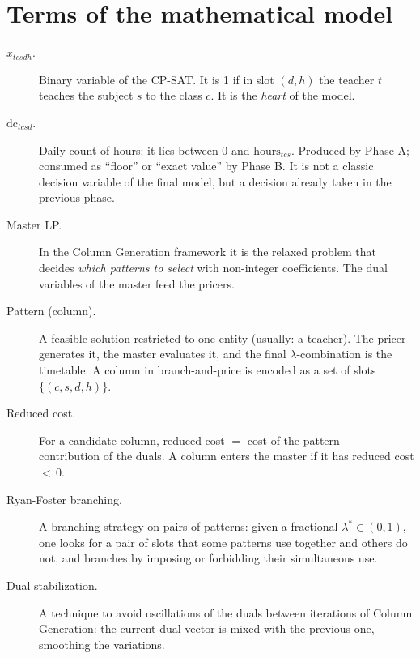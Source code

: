 \section{Terms of the mathematical model}

\begin{description}
\item[$x_{tcsdh}$.]
  Binary variable of the CP-SAT. It is 1 if in slot $(d,h)$ the
  teacher $t$ teaches the subject $s$ to the class $c$. It is the
  \emph{heart} of the model.

\item[$\text{dc}_{tcsd}$.]
  Daily count of hours: it lies between 0 and
  $\text{hours}_{tcs}$. Produced by Phase A; consumed as ``floor''
  or ``exact value'' by Phase B. It is not a classic decision
  variable of the final model, but a decision already taken in the
  previous phase.

\item[Master LP.]
  In the Column Generation framework it is the relaxed problem
  that decides \emph{which patterns to select} with non-integer
  coefficients. The dual variables of the master feed the pricers.

\item[Pattern (column).]
  A feasible solution restricted to one entity (usually: a
  teacher). The pricer generates it, the master evaluates it, and
  the final $\lambda$-combination is the timetable. A column in
  branch-and-price is encoded as a set of slots
  $\{(c,s,d,h)\}$.

\item[Reduced cost.]
  For a candidate column, reduced cost $=$ cost of the pattern $-$
  contribution of the duals. A column enters the master if it has
  reduced cost $<\,$0.

\item[Ryan-Foster branching.]
  A branching strategy on pairs of patterns: given a fractional
  $\lambda^* \in (0,1)$, one looks for a pair of slots that some
  patterns use together and others do not, and branches by
  imposing or forbidding their simultaneous use.

\item[Dual stabilization.]
  A technique to avoid oscillations of the duals between
  iterations of Column Generation: the current dual vector is
  mixed with the previous one, smoothing the variations.
\end{description}


